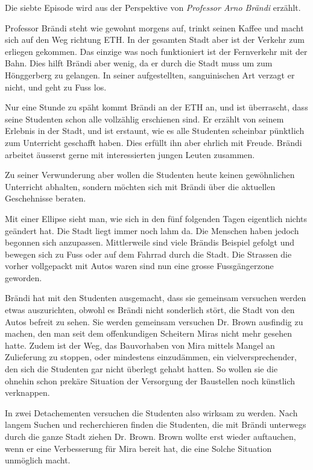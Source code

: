 \documentclass[11pt,a4paper,ngerman]{scrreprt}
\begin{document}
Die siebte Episode wird aus der Perspektive von \emph{Professor Arno Brändi}
erzählt.

Professor Brändi steht wie gewohnt morgens auf, trinkt seinen Kaffee und
macht sich auf den Weg richtung ETH. In der gesamten Stadt aber ist der
Verkehr zum erliegen gekommen. Das einzige was noch funktioniert ist der
Fernverkehr mit der Bahn. Dies hilft Brändi aber wenig, da er durch die Stadt
muss um zum Hönggerberg zu gelangen. In seiner aufgestellten, sanguinischen
Art verzagt er nicht, und geht zu Fuss los.

Nur eine Stunde zu späht kommt Brändi an der ETH an, und ist überrascht, dass
seine Studenten schon alle vollzählig erschienen sind. Er erzählt von seinem
Erlebnis in der Stadt, und ist erstaunt, wie es alle Studenten scheinbar
pünktlich zum Unterricht geschafft haben. Dies erfüllt ihn aber ehrlich mit
Freude. Brändi arbeitet äusserst gerne mit interessierten jungen Leuten
zusammen.

Zu seiner Verwunderung aber wollen die Studenten heute keinen gewöhnlichen
Unterricht abhalten, sondern möchten sich mit Brändi über die aktuellen
Geschehnisse beraten.

Mit einer Ellipse sieht man, wie sich in den fünf folgenden Tagen eigentlich
nichts geändert hat. Die Stadt liegt immer noch lahm da. Die Menschen haben
jedoch begonnen sich anzupassen. Mittlerweile sind viele Brändis Beispiel
gefolgt und bewegen sich zu Fuss oder auf dem Fahrrad durch die Stadt. Die
Strassen die vorher vollgepackt mit Autos waren sind nun eine grosse
Fussgängerzone geworden.

Brändi hat mit den Studenten ausgemacht, dass sie gemeinsam versuchen werden
etwas auszurichten, obwohl es Brändi nicht sonderlich stört, die Stadt von
den Autos befreit zu sehen. Sie werden gemeinsam versuchen Dr. Brown
ausfindig zu machen, den man seit dem offenkundigen Scheitern Miras nicht
mehr gesehen hatte. Zudem ist der Weg, das Bauvorhaben von Mira mittels
Mangel an Zulieferung zu stoppen, oder mindestens einzudämmen, ein
vielversprechender, den sich die Studenten gar nicht überlegt gehabt
hatten. So wollen sie die ohnehin schon prekäre Situation der Versorgung der
Baustellen noch künstlich verknappen.

In zwei Detachementen versuchen die Studenten also wirksam zu werden. Nach
langem Suchen und recherchieren finden die Studenten, die mit Brändi
unterwegs durch die ganze Stadt ziehen Dr. Brown. Brown wollte erst wieder
auftauchen, wenn er eine Verbesserung für Mira bereit hat, die eine Solche
Situation unmöglich macht.
\end{document}

